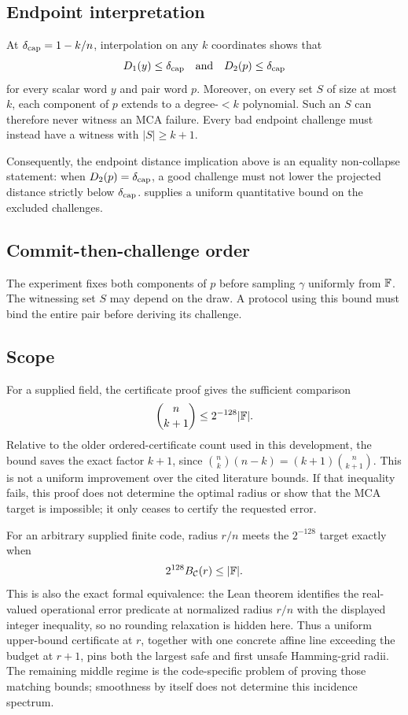 \subsection{Endpoint interpretation}

At \(\delta_{\mathrm{cap}}=1-k/n\), interpolation on any \(k\) coordinates shows that
\[
  D_1(y)\le\delta_{\mathrm{cap}}
  \quad\text{and}\quad
  D_2(p)\le\delta_{\mathrm{cap}}
\]
for every scalar word \(y\) and pair word \(p\).  Moreover, on every set
\(S\) of size at most \(k\), each component of \(p\) extends to a
degree-\(<k\) polynomial.  Such an \(S\) can therefore never witness an MCA
failure.  Every bad endpoint challenge must instead have a witness with
\(|S|\ge k+1\).

Consequently, the endpoint distance implication above is an equality
non-collapse statement: when \(D_2(p)=\delta_{\mathrm{cap}}\), a good challenge must not
lower the projected distance strictly below \(\delta_{\mathrm{cap}}\).
 supplies a uniform quantitative bound on the
excluded challenges.

\subsection{Commit-then-challenge order}

The experiment fixes both components of \(p\) before sampling
\(\gamma\) uniformly from \(\mathbb{F}\). The witnessing set \(S\) may depend on
the draw. A protocol using this bound must bind the entire pair before
deriving its challenge.

\subsection{Scope}

For a supplied field, the certificate proof gives the sufficient comparison
\[
  \binom n{k+1}\le 2^{-128}|\mathbb{F}|.
\]
Relative to the older ordered-certificate count used in this development,
the bound saves the exact factor \(k+1\), since
\(\binom nk(n-k)=(k+1)\binom n{k+1}\).
This is not a uniform improvement over the cited literature bounds.
If that inequality fails, this proof does not determine the optimal radius or
show that the MCA target is impossible; it only ceases to certify the requested
error.

For an arbitrary supplied finite code, radius \(r/n\) meets the
\(2^{-128}\) target exactly when
\[
  2^{128}B_{\mathcal C}(r)\le|\mathbb{F}|.
\]
This is also the exact formal equivalence: the Lean theorem identifies the
real-valued operational error predicate at normalized radius \(r/n\) with the
displayed integer inequality, so no rounding relaxation is hidden here.
Thus a uniform upper-bound certificate at \(r\), together with one concrete
affine line exceeding the budget at \(r+1\), pins both the largest safe and
first unsafe Hamming-grid radii. The remaining middle regime is the
code-specific problem of proving those matching bounds; smoothness by itself
does not determine this incidence spectrum.

